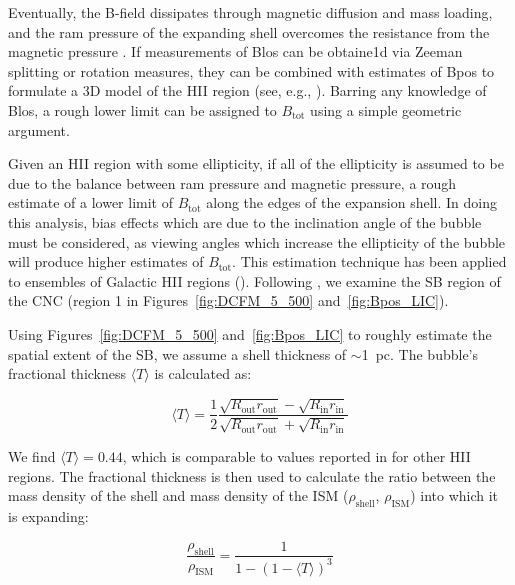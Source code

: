 Eventually, the B-field dissipates through magnetic diffusion and mass loading, and the ram pressure of the expanding shell overcomes the resistance from the magnetic pressure \citep{pavel2012h}. If measurements of \gls{Blos} can be obtaine1d via Zeeman splitting or rotation measures, they can be combined with estimates of \gls{Bpos} to formulate a 3D model of the HII region (see, e.g., \citet{aghanim2016planck}). Barring any knowledge of \gls{Blos}, a rough lower limit can be assigned to $B_{\mathrm{\mathrm{tot}}}$ using a simple geometric argument.

Given an HII region with some ellipticity, if all of the ellipticity is assumed to be due to the balance between ram pressure and magnetic pressure, a rough estimate of a lower limit of $B_{\mathrm{\mathrm{tot}}}$ along the edges of the expansion shell. In doing this analysis, bias effects which are due to the inclination angle of the bubble must be considered, as viewing angles which increase the ellipticity of the bubble will produce higher estimates of $B_{\mathrm{\mathrm{tot}}}$. This estimation technique has been applied to ensembles of Galactic HII regions (\citet{churchwell2006bubbling,pavel2012h}). Following \citet{pavel2012h}, we examine the SB region of the CNC (region 1 in Figures~\ref{fig:DCFM_5_500} and~\ref{fig:Bpos_LIC}).

Using Figures~\ref{fig:DCFM_5_500} and~\ref{fig:Bpos_LIC} to roughly estimate the spatial extent of the SB, we assume a shell thickness of $\sim$1~pc. The bubble's fractional thickness $\langle T \rangle$ is calculated as:

\begin{equation}
  \langle T \rangle = \frac{1}{2} \frac{ \sqrt{R_{\mathrm{out}}r_{\mathrm{out}}} - \sqrt{R_{\mathrm{in}}r_{\mathrm{in}}} }{\sqrt{R_{\mathrm{out}}r_{\mathrm{out}}} + \sqrt{R_{\mathrm{in}}r_{\mathrm{in}}}}
\end{equation}

We find $\langle T \rangle = 0.44$, which is comparable to values reported in \citet{pavel2012h} for other HII regions. The fractional thickness is then used to calculate the ratio between the mass density of the shell and mass density of the ISM ($\rho_{\mathrm{shell}}$, $\rho_{\mathrm{ISM}}$) into which it is expanding:

\begin{equation}\label{eq:rho rat}
  \frac{\rho_{\mathrm{shell}}}{\rho_{\mathrm{ISM}}} = \frac{ 1 }{1 - \left( 1 - \langle T \rangle \right)^{3}}
\end{equation}

